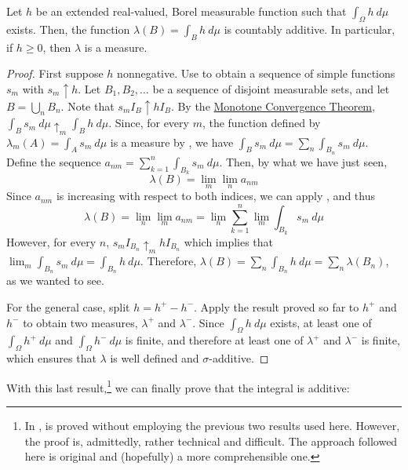 \begin{thrm}\label{theorem:integral defines a measure} Let \(h\) be an
extended real-valued, Borel measurable function such that
\(\int_{\Omega}h~d\mu\) exists. Then, the function \(\lambda(B)=\int_{B}h~d\mu\)
is countably additive. In particular, if \(h\geq0\), then \(\lambda\) is a
measure.
\end{thrm}
\begin{proof} First suppose \(h\) nonnegative. Use  to obtain a sequence of simple functions \(s_{m}\) with
\(s_{m}\uparrow h\). Let \(B_{1},B_{2},\dotsc\) be a sequence of disjoint
measurable sets, and let \(B=\bigcup_{n}B_{n}\). Note that
\(s_{m}I_{B}\uparrow hI_{B}\). By the \hyperref[theorem:Monotone
Convergence]{Monotone Convergence Theorem},
\(\int_{B}s_{m}~d\mu\uparrow_{m}\int_{B}h~d\mu\). Since, for every \(m\), the
function defined by \(\lambda_{m}(A)=\int_{A}s_{m}~d\mu\) is a measure by
, we have
\(\int_{B}s_{m}~d\mu=\sum_{n}\int_{B_{n}}s_{m}~d\mu\).  Define the sequence
\(a_{nm}=\sum_{k=1}^{n}\int_{B_{k}}s_{m}~d\mu\). Then, by what we have just
seen,
	\[ \lambda(B)=\lim_{m}\lim_{n}a_{nm}
	\] Since \(a_{nm}\) is increasing with respect to both indices, we can apply
, and thus
	\[ \lambda(B)=\lim_{n}\lim_{m}a_{nm}=\lim_{n}\sum_{k=1}^{n}\lim_{m}\int_{B_{k}}s_{m}~d\mu
	\] However, for every \(n\), \(s_{m}I_{B_{n}}\uparrow_mhI_{B_{n}}\) which
implies that \(\lim_{m}\int_{B_{n}}s_{m}~d\mu=\int_{B_{n}}h~d\mu\). Therefore,
\(\lambda(B)=\sum_{n}\int_{B_{n}}h~d\mu=\sum_{n}\lambda(B_{n})\), as we wanted
to see.
	
	For the general case, split \(h=h^+-h^-\). Apply the result proved so far to
\(h^+\) and \(h^-\) to obtain two measures, \(\lambda^+\) and \(\lambda^-\).
Since \(\int_{\Omega}h~d\mu\) exists, at least one of \(\int_{\Omega}h^+~d\mu\)
and \(\int_{\Omega}h^-~d\mu\) is finite, and therefore at least one of
\(\lambda^+\) and \(\lambda^-\) is finite, which ensures that \(\lambda\) is
well defined and \(\sigma\)-additive.
\end{proof}
With this last result,\footnote{In \cite{ash1972real},  is proved without employing the previous two results used here. However, the proof is, admittedly, rather technical and difficult. The approach followed here is original and (hopefully) a more comprehensible one.} we can finally prove that the integral is additive:
